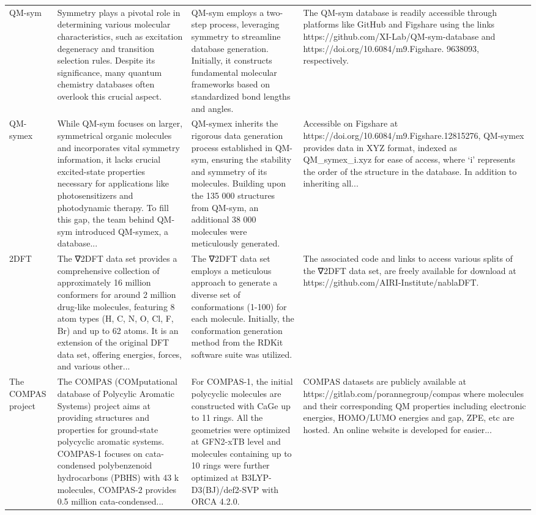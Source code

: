 \documentclass[12pt]{article}
\begin{document}
\begin{longtable}{p{}p{}p{}p{}}
QM-sym \cite{ds29-38} & Symmetry plays a pivotal role in determining various molecular characteristics, such as excitation degeneracy and transition selection rules. Despite its significance, many quantum chemistry databases often overlook this crucial aspect. & QM-sym employs a two-step process, leveraging symmetry to streamline database generation. Initially, it constructs fundamental molecular frameworks based on standardized bond lengths and angles. & The QM-sym database is readily accessible through platforms like GitHub and Figshare using the links https://github.com/XI-Lab/QM-sym-database and https://doi.org/10.6084/m9.Figshare. 9638093, respectively. \cite{ds29-152,ds29-153} \\
QM-symex \cite{ds30-35} & While QM-sym focuses on larger, symmetrical organic molecules and incorporates vital symmetry information, it lacks crucial excited-state properties necessary for applications like photosensitizers and photodynamic therapy. To fill this gap, the team behind QM-sym introduced QM-symex, a database... & QM-symex inherits the rigorous data generation process established in QM-sym, ensuring the stability and symmetry of its molecules. Building upon the 135 000 structures from QM-sym, an additional 38 000 molecules were meticulously generated. & Accessible on Figshare at https://doi.org/10.6084/m9.Figshare.12815276, QM-symex provides data in XYZ format, indexed as QM\_symex\_i.xyz for ease of access, where `i' represents the order of the structure in the database. In addition to inheriting all... \cite{ds30-154} \\
2DFT \cite{ds31-23} & The ∇2DFT data set provides a comprehensive collection of approximately 16 million conformers for around 2 million drug-like molecules, featuring 8 atom types (H, C, N, O, Cl, F, Br) and up to 62 atoms. It is an extension of the original DFT data set, offering energies, forces, and various other... & The ∇2DFT data set employs a meticulous approach to generate a diverse set of conformations (1-100) for each molecule. Initially, the conformation generation method from the RDKit software suite was utilized. & The associated code and links to access various splits of the ∇2DFT data set, are freely available for download at https://github.com/AIRI-Institute/nablaDFT. \cite{ds31-23} \\
The COMPAS project \cite{ds32-12} & The COMPAS (COMputational database of Polycylic Aromatic Systems) project aims at providing structures and properties for ground-state polycyclic aromatic systems. COMPAS-1 focuses on cata-condensed polybenzenoid hydrocarbons (PBHS) with 43 k molecules, COMPAS-2 provides 0.5 million cata-condensed... & For COMPAS-1, the initial polycyclic molecules are constructed with CaGe up to 11 rings. All the geometries were optimized at GFN2-xTB level and molecules containing up to 10 rings were further optimized at B3LYP-D3(BJ)/def2-SVP with ORCA 4.2.0. & COMPAS datasets are publicly available at https://gitlab.com/porannegroup/compas where molecules and their corresponding QM properties including electronic energies, HOMO/LUMO energies and gap, ZPE, etc are hosted. An online website is developed for easier... \cite{ds32-161} \\

\end{longtable}
\end{document}
